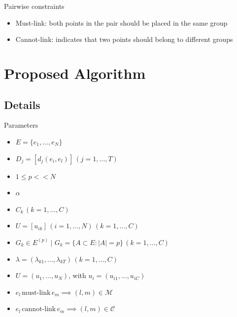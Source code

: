 \documentclass{beamer}
\begin{document}
\begin{frame}{Pairwise constraints}
	\begin{itemize}
	\item{Must-link: both points in the pair should be placed in the same group}
	\item{Cannot-link: indicates that two points should belong to different groups}
	\end{itemize}
\end{frame}

\section{Proposed Algorithm}

%
\subsection{Details}

\begin{frame}{Parameters}
\begin{itemize}
\item{$E=\{e_{1},\ldots,e_{N}\}$}
\item{$D_{j}=[d_{j}(e_{i},e_{l})]\,(j=1,\ldots,T)$}
\item{$1 \leq p << N$}
\item{$\alpha$}
\item{$C_{k}\,(k=1,\ldots,C)$}
\item{$U=[u_{ik}]\,(i=1,\ldots,N)\,(k=1,\ldots,C)$}
\item{$G_{k} \in E^{(p)} \mid G_{k}=\{A \subset E:\left|{A}\right|=p\}\,(k=1,\ldots,C)$}
\item{$\lambda=(\lambda_{k1},\ldots,\lambda_{kT})\,(k=1,\ldots,C)$}
\item{${U}=({u}_1,\ldots,{u}_N)$, with ${u}_i=(u_{i1},\ldots,u_{iC})$}
\item{$e_{l}\,\text{must-link}\,e_{m} \implies (l,m) \in \mathcal{M}$}
\item{$e_{l}\,\text{cannot-link}\,e_{m} \implies (l,m) \in \mathcal{C}$}
\end{itemize}
\end{frame}
\end{document}
